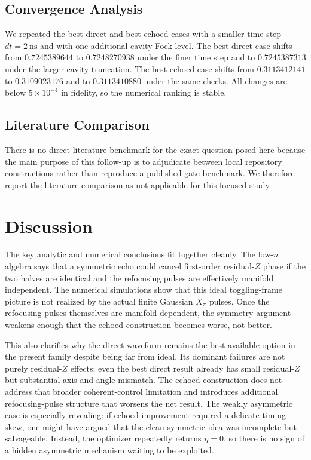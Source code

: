 \documentclass[aps,pra,twocolumn,reprint,floatfix,amsmath,amssymb]{revtex4-2}
\begin{document}
\subsection{Convergence Analysis}
We repeated the best direct and best echoed cases with a smaller time step $dt=\SI{2}{\nano\second}$ and with one additional cavity Fock level. The best direct case shifts from $0.7245389644$ to $0.7248270938$ under the finer time step and to $0.7245387313$ under the larger cavity truncation. The best echoed case shifts from $0.3113412141$ to $0.3109023176$ and to $0.3113410880$ under the same checks. All changes are below $5\times 10^{-4}$ in fidelity, so the numerical ranking is stable.

\subsection{Literature Comparison}
There is no direct literature benchmark for the exact question posed here because the main purpose of this follow-up is to adjudicate between local repository constructions rather than reproduce a published gate benchmark. We therefore report the literature comparison as not applicable for this focused study.

\section{Discussion}
The key analytic and numerical conclusions fit together cleanly. The low-$n$ algebra says that a symmetric echo could cancel first-order residual-$Z$ phase if the two halves are identical and the refocusing pulses are effectively manifold independent. The numerical simulations show that this ideal toggling-frame picture is not realized by the actual finite Gaussian $X_\pi$ pulses. Once the refocusing pulses themselves are manifold dependent, the symmetry argument weakens enough that the echoed construction becomes worse, not better.

This also clarifies why the direct waveform remains the best available option in the present family despite being far from ideal. Its dominant failures are not purely residual-$Z$ effects; even the best direct result already has small residual-$Z$ but substantial axis and angle mismatch. The echoed construction does not address that broader coherent-control limitation and introduces additional refocusing-pulse structure that worsens the net result. The weakly asymmetric case is especially revealing: if echoed improvement required a delicate timing skew, one might have argued that the clean symmetric idea was incomplete but salvageable. Instead, the optimizer repeatedly returns $\eta=0$, so there is no sign of a hidden asymmetric mechanism waiting to be exploited.
\end{document}
